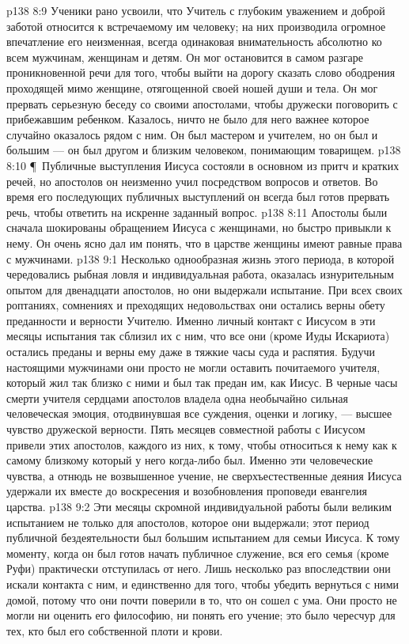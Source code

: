 \vs p138 8:9 Ученики рано усвоили, что Учитель с глубоким уважением и доброй заботой относится к  встречаемому им человеку; на них производила огромное впечатление его неизменная, всегда одинаковая внимательность абсолютно ко всем мужчинам, женщинам и детям. Он мог остановится в самом разгаре проникновенной речи для того, чтобы выйти на дорогу сказать слово ободрения проходящей мимо женщине, отягощенной своей ношей души и тела. Он мог прервать серьезную беседу со своими апостолами, чтобы дружески поговорить с прибежавшим ребенком. Казалось, ничто не было для него важнее  которое случайно оказалось рядом с ним. Он был мастером и учителем, но он был и большим --- он был другом и близким человеком, понимающим товарищем.
\vs p138 8:10 \P\ Публичные выступления Иисуса состояли в основном из притч и кратких речей, но апостолов он неизменно учил посредством вопросов и ответов. Во время его последующих публичных выступлений он всегда был готов прервать речь, чтобы ответить на искренне заданный вопрос.
\vs p138 8:11 Апостолы были сначала шокированы обращением Иисуса с женщинами, но быстро привыкли к нему. Он очень ясно дал им понять, что в царстве женщины имеют равные права с мужчинами.
\vs p138 9:1 Несколько однообразная жизнь этого периода, в которой чередовались рыбная ловля и индивидуальная работа, оказалась изнурительным опытом для двенадцати апостолов, но они выдержали испытание. При всех своих роптаниях, сомнениях и преходящих недовольствах они остались верны обету преданности и верности Учителю. Именно личный контакт с Иисусом в эти месяцы испытания так сблизил их с ним, что все они (кроме Иуды Искариота) остались преданы и верны ему даже в тяжкие часы суда и распятия. Будучи настоящими мужчинами они просто не могли оставить почитаемого учителя, который жил так близко с ними и был так предан им, как Иисус. В черные часы смерти учителя сердцами апостолов владела одна необычайно сильная человеческая эмоция, отодвинувшая все суждения, оценки и логику, --- высшее чувство дружеской верности. Пять месяцев совместной работы с Иисусом привели этих апостолов, каждого из них, к тому, чтобы относиться к нему как к самому близкому  который у него когда\hyp{}либо был. Именно эти человеческие чувства, а отнюдь не возвышенное учение, не сверхъестественные деяния Иисуса удержали их вместе до воскресения и возобновления проповеди евангелия царства.
\vs p138 9:2 Эти месяцы скромной индивидуальной работы были великим испытанием не только для апостолов, которое они выдержали; этот период публичной бездеятельности был большим испытанием для семьи Иисуса. К тому моменту, когда он был готов начать публичное служение, вся его семья (кроме Руфи) практически отступилась от него. Лишь несколько раз впоследствии они искали контакта с ним, и единственно для того, чтобы убедить вернуться с ними домой, потому что они почти поверили в то, что он сошел с ума. Они просто не могли ни оценить его философию, ни понять его учение; это было чересчур для тех, кто был его собственной плоти и крови.
